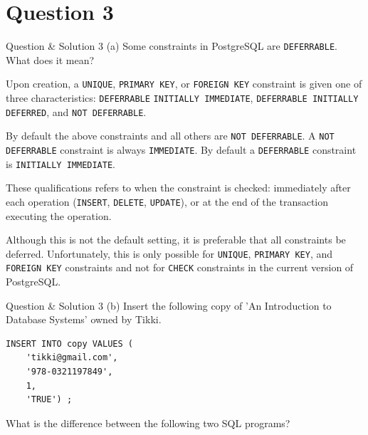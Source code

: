 \section*{Question 3}

\begin{frame}[fragile]{Question \& Solution 3 (a)}
Some constraints in PostgreSQL are \texttt{DEFERRABLE}. What does it mean? \vspace{10pt}

Upon creation, a \texttt{UNIQUE}, \texttt{PRIMARY KEY}, or \texttt{FOREIGN KEY} constraint is given one of three characteristics: \texttt{DEFERRABLE} \texttt{INITIALLY IMMEDIATE}, \texttt{DEFERRABLE INITIALLY DEFERRED}, and \texttt{NOT DEFERRABLE}.  \vspace{10pt}

By default the above constraints and all others are \texttt{NOT DEFERRABLE}. A \texttt{NOT DEFERRABLE} constraint is always \texttt{IMMEDIATE}. By default a \texttt{DEFERRABLE} constraint is \texttt{INITIALLY IMMEDIATE}. \vspace{10pt}

These qualifications refers to when the constraint is checked: immediately after each operation (\texttt{INSERT}, \texttt{DELETE}, \texttt{UPDATE}), or at the end of the transaction executing the operation. \vspace{10pt}

Although this is not the default setting, it is preferable that all constraints be deferred. Unfortunately, this is only possible for \texttt{UNIQUE}, \texttt{PRIMARY KEY}, and \texttt{FOREIGN KEY} constraints and not for \texttt{CHECK} constraints in the current version of PostgreSQL.
\end{frame}


\begin{frame}[fragile]{Question \& Solution 3 (b)}
Insert the following copy of 'An Introduction to Database Systems' owned by Tikki. \vspace{10pt}

\begin{lstlisting}
INSERT INTO copy VALUES (
	'tikki@gmail.com', 
	'978-0321197849', 
	1, 
	'TRUE') ;
\end{lstlisting}

What is the difference between the following two SQL programs?
\end{frame}


